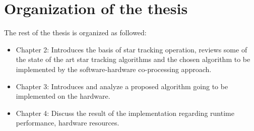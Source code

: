 \section{Organization of the thesis}
The rest of the thesis is organized as followed:
\begin{itemize}
	\item Chapter 2: Introduces the basis of star tracking operation, reviews some of the state of the art star tracking algorithms and the chosen algorithm to be implemented by the software-hardware co-processing approach.
	\item Chapter 3: Introduces and analyze a proposed algorithm going to be implemented on the hardware.
	\item Chapter 4: Discuss the result of the implementation regarding runtime performance, hardware resources.
\end{itemize}
